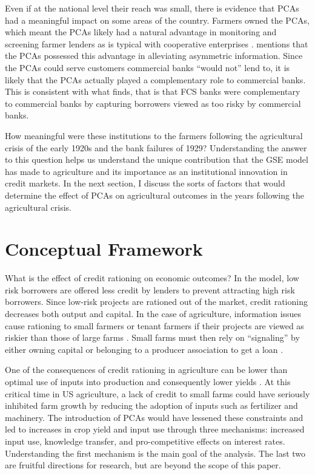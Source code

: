 \documentclass[12pt]{article}
\begin{document}
Even if at the national level their reach was small, there is evidence that PCAs had a meaningful impact on some areas of the country.
Farmers owned the PCAs, which meant the PCAs likely had a natural advantage in monitoring and screening farmer lenders as is typical with cooperative enterprises \citep{hueth2015agents,smith_adverse_1990}. 
\citet{Arnold1958} mentions that the PCAs possessed this advantage in alleviating asymmetric information.
 Since the PCAs could serve customers commercial banks ``would not'' lend to, it is likely that the PCAs actually played a complementary role to commercial banks.
 This is consistent with what \citet{alston_why_1994} finds, that is that FCS banks were complementary to commercial banks by capturing borrowers viewed as too risky by commercial banks.

How meaningful were these institutions to the farmers following the agricultural crisis of the early 1920s and the bank failures of 1929?
Understanding the answer to this question helps us understand the unique contribution that the GSE model has made to agriculture and its importance as an institutional innovation in credit markets.
In the next section, I discuss the sorts of factors that would determine the effect of PCAs on agricultural outcomes in the years following the agricultural crisis.

\section*{Conceptual Framework}

What is the effect of credit rationing on economic outcomes?
In the \citet{Bencivenga1993} model, low risk borrowers are offered less credit by lenders to prevent attracting high risk borrowers. 
Since low-risk projects are rationed out of the market, credit rationing decreases both output and capital. 
In the case of agriculture, information issues cause rationing to small farmers or tenant farmers if their projects are viewed as riskier than those of large farms \citep{carter_equilibrium_1988,stiglitz_credit_1981}. 
Small farms must then rely on ``signaling'' by either owning capital or belonging to a producer association to get a loan \citep{hoff_introduction:_1990}.

One of the consequences of credit rationing in agriculture can be lower than optimal use of inputs into production and consequently lower yields \citep{carter_impact_1989,foltz_credit_2004}.
At this critical time in US agriculture, a lack of credit to small farms could have seriously inhibited farm growth by reducing the adoption of inputs such as fertilizer and machinery.
The introduction of PCAs would have lessened these constraints and led to increases in crop yield and input use through three mechanisms: increased input use, knowledge transfer, and pro-competitive effects on interest rates. 
Understanding the first mechanism is the main goal of the analysis. 
The last two are fruitful directions for research, but are beyond the scope of this paper.
\end{document}
